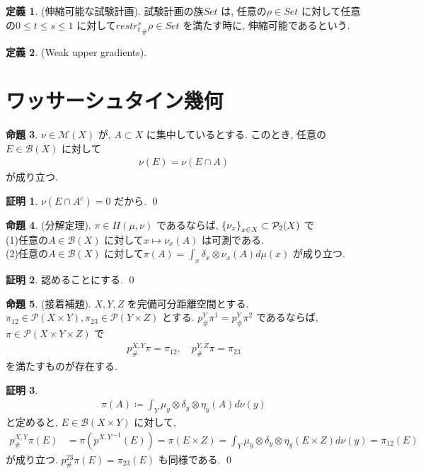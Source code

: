 \documentclass[10pt, fleqn, label-section=none]{bxjsarticle}
\theoremstyle{definition}
\newtheorem{dfn}{定義}[section]
\newtheorem{prop}[dfn]{命題}
\newtheorem*{pf*}{証明}
\newcommand{\cbra}[1]{\mleft\{#1\mright\}}
\renewcommand{\;}{\, ; \,}
\begin{document}
\begin{dfn}(伸縮可能な試験計画). 試験計画の族$Set$ は, 任意の$\rho \in Set$ に対して任意の$0 \leq t \leq s \leq 1$ に対して${restr_t^s} _\# \rho \in Set$ を満たす時に, 伸縮可能であるという. 
\end{dfn}

\begin{dfn}(Weak upper gradients). 

\end{dfn}


\section{ワッサーシュタイン幾何}

\begin{prop}$\nu \in \mathcal M (X)$ が, $A \subset  X$ に集中しているとする. このとき, 任意の$E \in \mathcal B (X)$ に対して
\begin{align*} \nu (E) = \nu(E \cap A) \end{align*}
が成り立つ.
\end{prop}
\begin{pf*}
$\nu (E \cap A^c) = 0$ だから. 
\qed
\end{pf*}


\begin{prop}(分解定理). $\pi \in \Pi (\mu, \nu)$ であるならば, $\cbra{\nu_x}_{x \in X} \subset \mathcal P_2 (X)$ で\\
(1)任意の$A \in \mathcal B (X)$ に対して$x \mapsto \nu_x (A)$ は可測である. \\
(2)任意の$A \in \mathcal B(X)$ に対して$\pi (A) = \int_x \delta_x \otimes \nu_x (A) d \mu (x)$ が成り立つ. 

\end{prop}
\begin{pf*}
認めることにする. 
\qed
\end{pf*}


\begin{prop}(接着補題). $X, Y, Z$ を完備可分距離空間とする. $\pi_{12} \in \mathcal P (X \times Y), \pi_{23} \in \mathcal P (Y \times Z)$ とする. $p^Y_\# \pi^1 = p^Y_\# \pi^2$ であるならば, $\pi \in \mathcal P (X\times Y \times Z)$ で
\begin{align*} p^{X,Y}_\# \pi = \pi_{12}, \quad p^{Y,Z}_\# \pi = \pi_{23} \end{align*}
を満たすものが存在する. 
\end{prop}
\begin{pf*}
\begin{align*} \pi(A) \coloneqq \int_Y \mu_y \otimes \delta_y \otimes \eta_y (A) d\nu(y)  \end{align*}
と定めると, $E \in \mathcal B(X\times Y)$ に対して, 
\begin{align*} p^{X,Y}_\# \pi (E) &= \pi ({p^{X,Y}}^{-1}(E)) = \pi(E \times Z) = \int_Y \mu_y \otimes \delta_y \otimes \eta_y (E \times Z) d \nu(y) = \pi_{12}(E) \end{align*}
が成り立つ. $p^{23}_\# \pi(E) = \pi_{23} (E)$ も同様である. 
\qed
\end{pf*}
\end{document}
